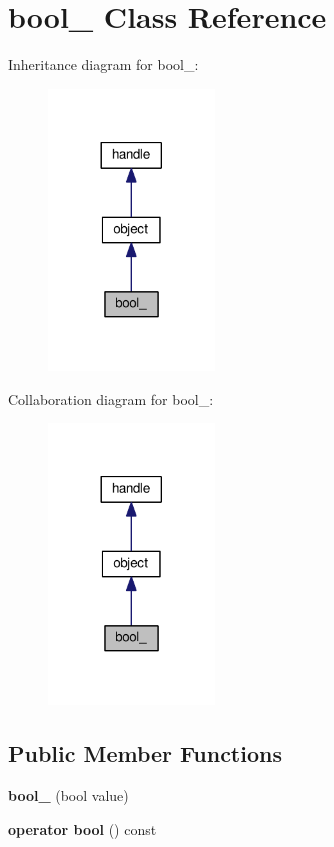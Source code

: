 \hypertarget{classbool__}{}\section{bool\+\_\+ Class Reference}
\label{classbool__}


Inheritance diagram for bool\+\_\+\+:
\nopagebreak
\begin{figure}[H]
\begin{center}
\leavevmode
\includegraphics[width=125pt]{classbool____inherit__graph}
\end{center}
\end{figure}


Collaboration diagram for bool\+\_\+\+:
\nopagebreak
\begin{figure}[H]
\begin{center}
\leavevmode
\includegraphics[width=125pt]{classbool____coll__graph}
\end{center}
\end{figure}
\subsection*{Public Member Functions}
\begin{DoxyCompactItemize}
\item 
{\bfseries bool\+\_\+} (bool value)\hypertarget{classbool___a9a6df8a2673d2c7652afc7ffd284d947}{}\label{classbool___a9a6df8a2673d2c7652afc7ffd284d947}

\item 
{\bfseries operator bool} () const \hypertarget{classbool___a0c8090ea7c06143fe683fccd26c2686d}{}\label{classbool___a0c8090ea7c06143fe683fccd26c2686d}

\end{DoxyCompactItemize}
